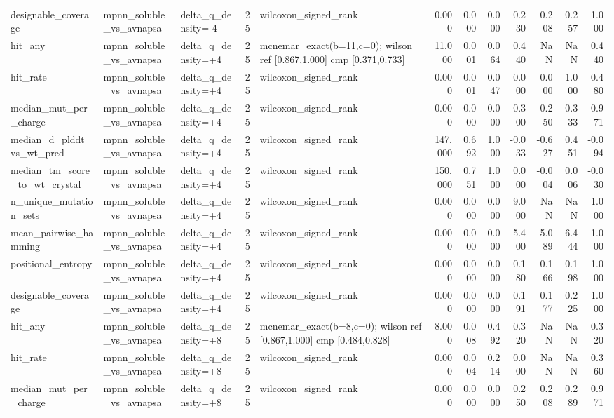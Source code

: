 \begin{table}
{\begin{tabular}{lllrlrrrrrrr}
designable\_coverage & mpnn\_soluble\_vs\_avnapsa & delta\_q\_density=-4 & 25 & wilcoxon\_signed\_rank & 0.000 & 0.000 & 0.000 & 0.230 & 0.208 & 0.257 & 1.000 \\
hit\_any & mpnn\_soluble\_vs\_avnapsa & delta\_q\_density=+4 & 25 & mcnemar\_exact(b=11,c=0); wilson ref [0.867,1.000] cmp [0.371,0.733] & 11.000 & 0.001 & 0.064 & 0.440 & NaN & NaN & 0.440 \\
hit\_rate & mpnn\_soluble\_vs\_avnapsa & delta\_q\_density=+4 & 25 & wilcoxon\_signed\_rank & 0.000 & 0.001 & 0.047 & 0.000 & 0.000 & 1.000 & 0.480 \\
median\_mut\_per\_charge & mpnn\_soluble\_vs\_avnapsa & delta\_q\_density=+4 & 25 & wilcoxon\_signed\_rank & 0.000 & 0.000 & 0.000 & 0.300 & 0.250 & 0.333 & 0.971 \\
median\_d\_plddt\_vs\_wt\_pred & mpnn\_soluble\_vs\_avnapsa & delta\_q\_density=+4 & 25 & wilcoxon\_signed\_rank & 147.000 & 0.692 & 1.000 & -0.033 & -0.627 & 0.451 & -0.094 \\
median\_tm\_score\_to\_wt\_crystal & mpnn\_soluble\_vs\_avnapsa & delta\_q\_density=+4 & 25 & wilcoxon\_signed\_rank & 150.000 & 0.751 & 1.000 & 0.000 & -0.004 & 0.006 & -0.030 \\
n\_unique\_mutation\_sets & mpnn\_soluble\_vs\_avnapsa & delta\_q\_density=+4 & 25 & wilcoxon\_signed\_rank & 0.000 & 0.000 & 0.000 & 9.000 & NaN & NaN & 1.000 \\
mean\_pairwise\_hamming & mpnn\_soluble\_vs\_avnapsa & delta\_q\_density=+4 & 25 & wilcoxon\_signed\_rank & 0.000 & 0.000 & 0.000 & 5.400 & 5.089 & 6.444 & 1.000 \\
positional\_entropy & mpnn\_soluble\_vs\_avnapsa & delta\_q\_density=+4 & 25 & wilcoxon\_signed\_rank & 0.000 & 0.000 & 0.000 & 0.180 & 0.166 & 0.198 & 1.000 \\
designable\_coverage & mpnn\_soluble\_vs\_avnapsa & delta\_q\_density=+4 & 25 & wilcoxon\_signed\_rank & 0.000 & 0.000 & 0.000 & 0.191 & 0.177 & 0.225 & 1.000 \\
hit\_any & mpnn\_soluble\_vs\_avnapsa & delta\_q\_density=+8 & 25 & mcnemar\_exact(b=8,c=0); wilson ref [0.867,1.000] cmp [0.484,0.828] & 8.000 & 0.008 & 0.492 & 0.320 & NaN & NaN & 0.320 \\
hit\_rate & mpnn\_soluble\_vs\_avnapsa & delta\_q\_density=+8 & 25 & wilcoxon\_signed\_rank & 0.000 & 0.004 & 0.214 & 0.000 & NaN & NaN & 0.360 \\
median\_mut\_per\_charge & mpnn\_soluble\_vs\_avnapsa & delta\_q\_density=+8 & 25 & wilcoxon\_signed\_rank & 0.000 & 0.000 & 0.000 & 0.250 & 0.208 & 0.289 & 0.971 \\

\end{tabular}}
\end{table}

